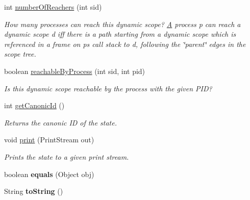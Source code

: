 \begin{DoxyCompactItemize}
int \hyperlink{classedu_1_1udel_1_1cis_1_1vsl_1_1civl_1_1state_1_1common_1_1immutable_1_1ImmutableMonoState_a401018c7bf43665cc7ccb292653e6ca7}{number\+Of\+Reachers} (int sid)
\begin{DoxyCompactList}\small\item\em How many processes can reach this dynamic scope? \hyperlink{structA}{A} process p can reach a dynamic scope d iff there is a path starting from a dynamic scope which is referenced in a frame on p\textquotesingle{}s call stack to d, following the \char`\"{}parent\char`\"{} edges in the scope tree. \end{DoxyCompactList}\item 
boolean \hyperlink{classedu_1_1udel_1_1cis_1_1vsl_1_1civl_1_1state_1_1common_1_1immutable_1_1ImmutableMonoState_ac5526c96a0a86a5dd7da324fa35f85f1}{reachable\+By\+Process} (int sid, int pid)
\begin{DoxyCompactList}\small\item\em Is this dynamic scope reachable by the process with the given P\+I\+D? \end{DoxyCompactList}\item 
int \hyperlink{classedu_1_1udel_1_1cis_1_1vsl_1_1civl_1_1state_1_1common_1_1immutable_1_1ImmutableMonoState_a28a4f6278358c567c56f9efba09204a8}{get\+Canonic\+Id} ()
\begin{DoxyCompactList}\small\item\em Returns the canonic I\+D of the state. \end{DoxyCompactList}\item 
void \hyperlink{classedu_1_1udel_1_1cis_1_1vsl_1_1civl_1_1state_1_1common_1_1immutable_1_1ImmutableMonoState_acac5d69aa079690720a3e339b622bf9c}{print} (Print\+Stream out)
\begin{DoxyCompactList}\small\item\em Prints the state to a given print stream. \end{DoxyCompactList}\item 
\hypertarget{classedu_1_1udel_1_1cis_1_1vsl_1_1civl_1_1state_1_1common_1_1immutable_1_1ImmutableMonoState_a008d36555059b2acdec798c5a0c97b41}{}boolean {\bfseries equals} (Object obj)\label{classedu_1_1udel_1_1cis_1_1vsl_1_1civl_1_1state_1_1common_1_1immutable_1_1ImmutableMonoState_a008d36555059b2acdec798c5a0c97b41}

\item 
\hypertarget{classedu_1_1udel_1_1cis_1_1vsl_1_1civl_1_1state_1_1common_1_1immutable_1_1ImmutableMonoState_a6e8e9243bef5a0337141a6c0ec18bbb6}{}String {\bfseries to\+String} ()\label{classedu_1_1udel_1_1cis_1_1vsl_1_1civl_1_1state_1_1common_1_1immutable_1_1ImmutableMonoState_a6e8e9243bef5a0337141a6c0ec18bbb6}


\end{DoxyCompactItemize}
